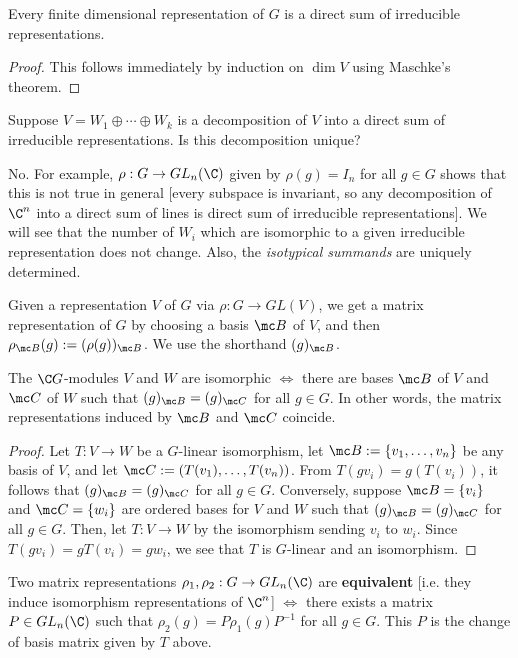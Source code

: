 \begin{cor}
    Every finite dimensional representation of $G$ is a direct sum of irreducible representations.
\end{cor}

\begin{proof}
This follows immediately by induction on $\dim V$ using Maschke's theorem.
\end{proof}

\begin{notebox*}[Question]
    Suppose $V = W_1 \oplus \cdots \oplus W_k$ is a decomposition of $V$ into a direct sum of irreducible representations. Is this decomposition unique?
\end{notebox*}

No. For example, $\rho :G \to GL_n(\C)$ given by $\rho (g)=I_n$ for all $g\in G$ shows that this is not true in general [every subspace is invariant, so any decomposition of $\C^n$ into a direct sum of lines is direct sum of irreducible representations]. We will see that the number of $W_i$ which are isomorphic to a given irreducible representation does not change. Also, the \textit{isotypical summands} are uniquely determined.

Given a representation $V$ of $G$ via $\rho :G \to GL(V)$, we get a matrix representation of $G$ by choosing a basis $\mc B$ of $V$, and then $\rho _{\mc B}(g):= (\rho(g))_{\mc B}$. We use the shorthand $(g)_{\mc B}$.

\begin{prop}
    The $\C G$-modules $V$ and $W$ are isomorphic $\iff$ there are bases $\mc B$ of $V$ and $\mc C$ of $W$ such that $(g)_{\mc B}=(g)_{\mc C}$ for all $g \in G$. In other words, the matrix representations induced by $\mc B$ and $\mc C$ coincide.
\end{prop}

\begin{proof}
Let $T:V \to W$ be a $G$-linear isomorphism, let $\mc B:= \{v_1,\dots,v_n\}$ be any basis of $V$, and let $\mc C := (T(v_1),\dots,T(v_n))$. From $T(gv_i)=g(T(v_i))$, it follows that $(g)_{\mc B}= (g)_{\mc C}$ for all $g \in G$. Conversely, suppose $\mc B = \{v_i\}$ and $\mc C =\{ w_i\}$ are ordered bases for $V$ and $W$ such that $(g)_{\mc B}=(g)_{\mc C}$ for all $g \in G$. Then, let $T:V \to W$ by the isomorphism sending $v_i$ to $w_i$. Since $T(gv_i)=gT(v_i)=gw_i$, we see that $T$ is $G$-linear and an isomorphism.
\end{proof}

\begin{cor}
    Two matrix representations $\rho_1,\rho_2 : G \to GL_n(\C)$ are \textbf{equivalent} [i.e. they induce isomorphism representations of $\C^n$] $\iff$ there exists a matrix $P \in GL_n(\C)$ such that $\rho_2(g)=P\rho_1(g)P^{-1}$ for all $g \in G$. This $P$ is the change of basis matrix given by $T$ above.
\end{cor}

